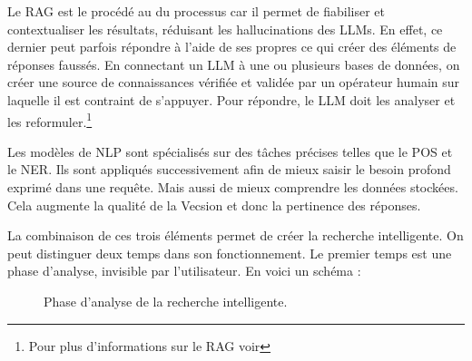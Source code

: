 Le \gls{RAG} est le procédé au \coeur du processus car il permet de fiabiliser et contextualiser les résultats, réduisant les hallucinations des \glspl{LLM}. En effet, ce dernier peut parfois répondre à l'aide de ses propres  ce qui créer des éléments de réponses faussés. En connectant un \gls{LLM} à une ou plusieurs bases de données, on créer une source de connaissances vérifiée et validée par un opérateur humain sur laquelle il est contraint de s'appuyer. Pour répondre, le \gls{LLM} doit les analyser et les reformuler.\footnote{Pour plus d'informations sur le \gls{RAG} voir \pageref{rag}}

Les modèles de \gls{NLP} sont spécialisés sur des tâches précises telles que le \gls{POS} et le \gls{NER}. Ils sont appliqués successivement afin de mieux saisir le besoin profond exprimé dans une requête. Mais aussi de mieux comprendre les données stockées. Cela augmente la qualité de la \gls{Vecsion} et donc la pertinence des réponses. 

La combinaison de ces trois éléments permet de créer la recherche intelligente. On peut distinguer deux temps dans son fonctionnement. Le premier temps est une phase d'analyse, invisible par l'utilisateur. En voici un schéma :

\begin{figure}[H] \label{procrag}
\centering
{}
\caption{Phase d'analyse de la recherche intelligente.}
\end{figure}

